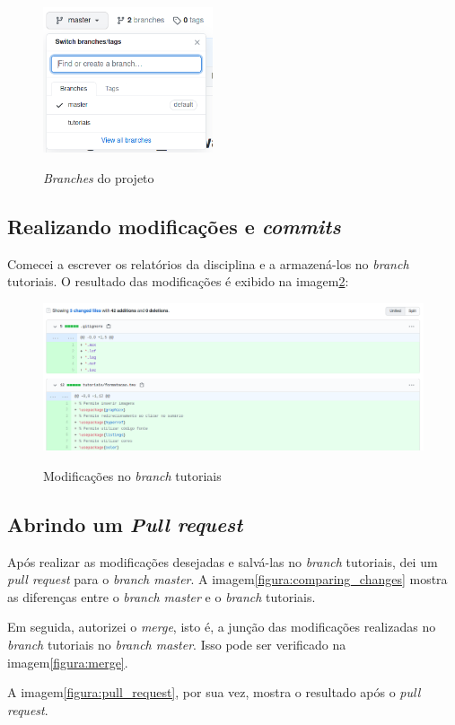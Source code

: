     \begin{figure}[H]
        \caption{\textit{Branches} do projeto}
        \vspace{0.5cm}
        \centering
        \includegraphics[width=5cm]{imagens/branch_tutoriais.png}
        \label{figura:branch_tutoriais}
    \end{figure}

    \subsection{Realizando modificações e \textit{commits}}
    Comecei a escrever os relatórios da disciplina e a armazená-los no \textit{branch} tutoriais. O resultado das modificações é exibido na imagem\ref{figura:changes}:
    
    \begin{figure}[H]
        \caption{Modificações no \textit{branch} tutoriais}
        \vspace{0.5cm}
        \centering
        \includegraphics[width=15cm]{imagens/changes.png}
        \label{figura:changes}
    \end{figure}

    \subsection{Abrindo um \textit{Pull request}}
    Após realizar as modificações desejadas e salvá-las no \textit{branch} tutoriais, dei um \textit{pull request} para o \textit{branch master}. A imagem\ref{figura:comparing_changes} mostra as diferenças entre o \textit{branch master} e o \textit{branch} tutoriais.
    \par Em seguida, autorizei o \textit{merge}, isto é, a junção das modificações realizadas no \textit{branch} tutoriais no \textit{branch master}. Isso pode ser verificado na imagem\ref{figura:merge}.
    \par A imagem\ref{figura:pull_request}, por sua vez, mostra o resultado após o \textit{pull request}.
    
